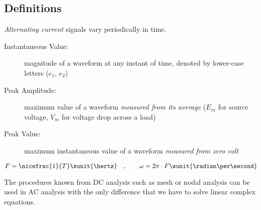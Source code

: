 \subsection{Definitions} %
	\emph{Alternating current} signals vary periodically in time.
	
	\begin{description}
		\item[Instantaneous Value:] magnitude of a waveform at any instant of time, denoted by lower-case letters ($e_1$, $e_2$)
		\item[Peak Amplitude:] maximum value of a waveform \emph{measured from its average} ($E_m$ for source voltage, $V_m$ for voltage drop across a load)
		\item[Peak Value:] maximum instantaneous value of a waveform \emph{measured from zero volt}
	\end{description}
	
	\[
		F = \nicefrac{1}{T} \sunit{\hertz} \quad, \qquad \omega = 2\pi \cdot F \sunit{\radian\per\second}
	\]
	
	The procedures known from DC analysis such as mesh or nodal analysis can be used in AC analysis with the only difference that we have to solve linear complex equations.
